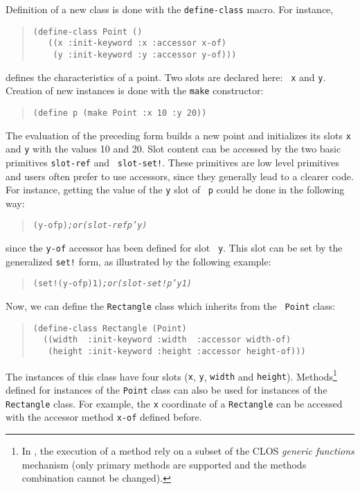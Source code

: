 {Definition of a new class is done with the {\tt define-class} macro. For
instance, 
\begin{quote}\figsize
\begin{verbatim}
(define-class Point ()
   ((x :init-keyword :x :accessor x-of)
    (y :init-keyword :y :accessor y-of)))
\end{verbatim}
\end{quote}
defines the characteristics of a point. Two slots are declared here: {\tt
x} and {\tt y}.
\noindent
Creation of new instances is done with the {\tt make} constructor: 
\begin{quote}\figsize
\begin{verbatim}
(define p (make Point :x 10 :y 20))
\end{verbatim}
\end{quote}
\noindent
The evaluation of the preceding form builds a new point and initializes
its slots {\tt x} and {\tt y} with the values 10 and 20. Slot content
can be accessed by the two basic primitives {\tt slot-ref} and {\tt
slot-set!}. These primitives are low level primitives and users often
prefer to use accessors, since they generally lead to a clearer
code. For instance, getting the value of the {\tt y} slot of {\tt
p} could be done in the following way:
\begin{quote}\figsize
\begin{alltt}
(y-of p)                {\em ; or (slot-ref p 'y)}
\end{alltt}
\end{quote}
\noindent
since the {\tt y-of} accessor has been defined for slot {\tt
y}. This slot can be set by the generalized {\tt set!}\label{set!}
form, as illustrated by the following example:
\begin{quote}\figsize
\begin{alltt}
(set! (y-of p) 1)       {\em ; or (slot-set! p 'y 1)}
\end{alltt}
\end{quote}

\noindent
Now, we can define the {\tt Rectangle} class which inherits from the {\tt
Point} class: 
\begin{quote}\figsize
\begin{verbatim}
(define-class Rectangle (Point)
  ((width  :init-keyword :width  :accessor width-of)
   (height :init-keyword :height :accessor height-of)))
\end{verbatim}
\end{quote}
\noindent
The instances of this class have four slots ({\tt x}, {\tt y}, {\tt width}
and {\tt height}).  Methods\footnote{In {\stklos}\cite{Gallesio95-1a}, the
execution of a method rely on a subset of the CLOS {\em generic functions}
mechanism (only primary methods are supported and the methods combination
cannot be changed).}  defined for instances of the {\tt Point} class can
also be used for instances of the {\tt Rectangle} class. For example, the
{\tt x} coordinate of a {\tt Rectangle} can be accessed with the accessor
method {\tt x-of} defined before.


}
